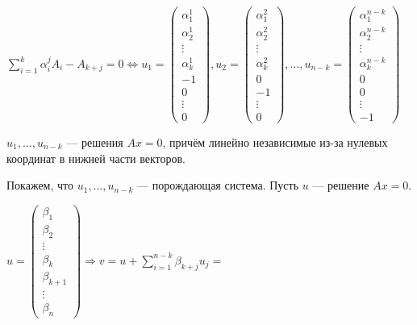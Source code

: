 \begin{itemize}
          \(\sum\limits_{i = 1}^k \alpha_i^j A_i - A_{k + j} = 0 \Leftrightarrow
          u_1 = \begin{pmatrix}
              \alpha_1^1 \\
              \alpha_2^1 \\
              \vdots     \\
              \alpha_k^1 \\
              -1         \\
              0          \\
              \vdots     \\
              0
          \end{pmatrix},
          u_2 = \begin{pmatrix}
              \alpha_1^2 \\
              \alpha_2^2 \\
              \vdots     \\
              \alpha_k^2 \\
              0          \\
              -1         \\
              \vdots     \\
              0
          \end{pmatrix}, \ldots,
          u_{n - k} = \begin{pmatrix}
              \alpha_1^{n - k} \\
              \alpha_2^{n - k} \\
              \vdots           \\
              \alpha_k^{n - k} \\
              0                \\
              0                \\
              \vdots           \\
              -1
          \end{pmatrix}\)

          \(u_1, \ldots, u_{n - k}\) --- решения \(Ax = 0\), причём линейно независимые из-за нулевых координат в нижней части векторов.

          Покажем, что \(u_1, \ldots, u_{n - k}\) --- порождающая система. Пусть \(u\) --- решение \(Ax = 0\).

          \(u =
          \begin{pmatrix}
              \beta_1       \\
              \beta_2       \\
              \vdots        \\
              \beta_k       \\
              \beta_{k + 1} \\
              \vdots        \\
              \beta_n
          \end{pmatrix} \Rightarrow v = u + \sum\limits_{i = 1}^{n - k} \beta_{k + j} u_j =\)


\end{itemize}
